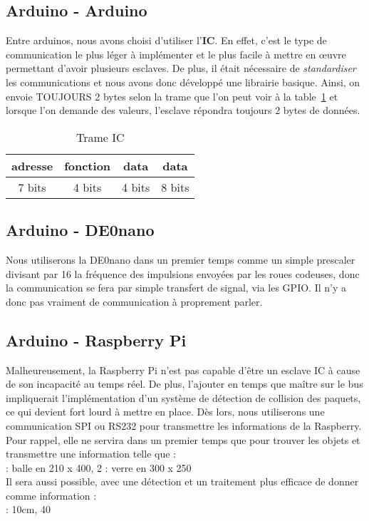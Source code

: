 \subsection{Arduino - Arduino}
\label{sub:EntreArduinos}

Entre arduinos, nous avons choisi d'utiliser l'\textbf{IC}. En effet, c'est le type de communication le plus léger à implémenter et le plus facile à mettre en œuvre permettant d'avoir plusieurs esclaves. De plus, il était nécessaire de \textit{standardiser} les communications et nous avons donc développé une librairie basique. Ainsi, on envoie TOUJOURS 2 bytes selon la trame que l'on peut voir à la table~\ref{tb:TrameI2C} et lorsque l'on demande des valeurs, l'esclave répondra toujours 2 bytes de données.

\begin{table}[!ht]
	\centering
	\begin{tabular}{|c|c|c|c|}
		\hline
		adresse & fonction & data & data \\
		\hline
		7 bits & 4 bits & 4 bits & 8 bits \\
		\hline
	\end{tabular}
	\caption{Trame IC}
	\label{tb:TrameI2C}
\end{table}

\subsection{Arduino - DE0nano}
Nous utiliserons la DE0nano dans un premier temps comme un simple prescaler divisant par 16 la fréquence des impulsions envoyées par les roues codeuses, donc la communication se fera par simple \og transfert de signal\fg, via les GPIO. Il n'y a donc pas vraiment de communication à proprement parler. 

\subsection{Arduino - Raspberry Pi}
Malheureusement, la Raspberry Pi n'est pas capable d'être un esclave IC à cause de son incapacité au temps réel. De plus, l'ajouter en temps que maître sur le bus impliquerait l'implémentation d'un système de détection de collision des paquets, ce qui devient fort lourd à mettre en place. Dès lors, nous utiliserons une communication SPI ou RS232 pour transmettre les informations de la Raspberry. Pour rappel, elle ne servira dans un premier temps que pour trouver les objets et transmettre une information telle que :\\

 : balle en 210 x 400, 2 : verre en 300 x 250\fg\\

\noindent Il sera aussi possible, avec une détection et un traitement plus efficace de donner comme information : \\

: 10cm, 40\angle\fg\\